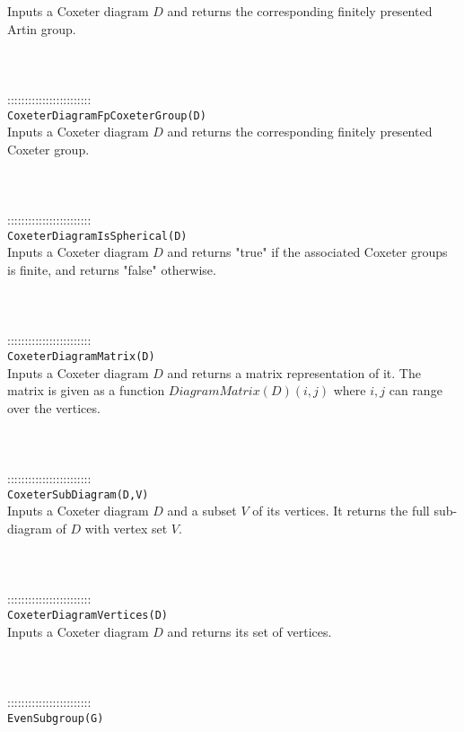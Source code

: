 \documentclass[a4paper,11pt]{report}
\begin{document}
{ Inputs a Coxeter diagram $D$ and returns the corresponding finitely presented Artin group. \\
 \\
 \\
 \\
 ::::::::::::::::::::::::\\
 \texttt{CoxeterDiagramFpCoxeterGroup(D) }\\
 

 Inputs a Coxeter diagram $D$ and returns the corresponding finitely presented Coxeter group. \\
 \\
 \\
 \\
 ::::::::::::::::::::::::\\
 \texttt{CoxeterDiagramIsSpherical(D) }\\
 

 Inputs a Coxeter diagram $D$ and returns "true" if the associated Coxeter groups is finite, and returns
"false" otherwise. \\
 \\
 \\
 \\
 ::::::::::::::::::::::::\\
 \texttt{CoxeterDiagramMatrix(D) }\\
 

 Inputs a Coxeter diagram $D$ and returns a matrix representation of it. The matrix is given as a function $DiagramMatrix(D)(i,j)$ where $i,j$ can range over the vertices. \\
 \\
 \\
 \\
 ::::::::::::::::::::::::\\
 \texttt{CoxeterSubDiagram(D,V) }\\
 

 Inputs a Coxeter diagram $D$ and a subset $V$ of its vertices. It returns the full sub-diagram of $D$ with vertex set $V$. \\
 \\
 \\
 \\
 ::::::::::::::::::::::::\\
 \texttt{CoxeterDiagramVertices(D) }\\
 

 Inputs a Coxeter diagram $D$ and returns its set of vertices. \\
 \\
 \\
 \\
 ::::::::::::::::::::::::\\
 \texttt{EvenSubgroup(G) }\\
 

}
\end{document}
